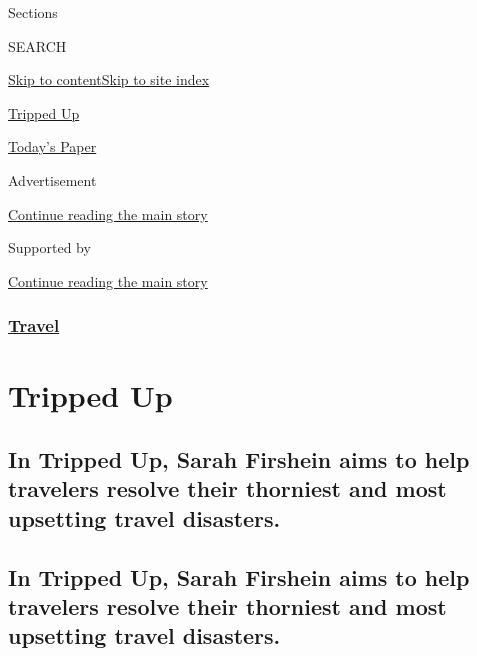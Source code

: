 Sections

SEARCH

\protect\hyperlink{site-content}{Skip to
content}\protect\hyperlink{site-index}{Skip to site index}

\href{https://www.nytimes.com/column/tripped-up}{Tripped Up}

\href{https://myaccount.nytimes.com/auth/login?response_type=cookie\&client_id=vi}{}

\href{https://www.nytimes.com/section/todayspaper}{Today's Paper}

Advertisement

\protect\hyperlink{after-top}{Continue reading the main story}

Supported by

\protect\hyperlink{after-sponsor}{Continue reading the main story}

\hypertarget{travel}{%
\subsubsection{\texorpdfstring{\href{/section/travel}{Travel}}{Travel}}\label{travel}}

\hypertarget{tripped-up}{%
\section{Tripped Up}\label{tripped-up}}

\hypertarget{in-tripped-up-sarah-firshein-aims-to-help-travelers-resolve-their-thorniest-and-most-upsetting-travel-disasters}{%
\subsection{In Tripped Up, Sarah Firshein aims to help travelers resolve
their thorniest and most upsetting travel
disasters.}\label{in-tripped-up-sarah-firshein-aims-to-help-travelers-resolve-their-thorniest-and-most-upsetting-travel-disasters}}

\hypertarget{in-tripped-up-sarah-firshein-aims-to-help-travelers-resolve-their-thorniest-and-most-upsetting-travel-disasters-1}{%
\subsection{In Tripped Up, Sarah Firshein aims to help travelers resolve
their thorniest and most upsetting travel
disasters.}\label{in-tripped-up-sarah-firshein-aims-to-help-travelers-resolve-their-thorniest-and-most-upsetting-travel-disasters-1}}

